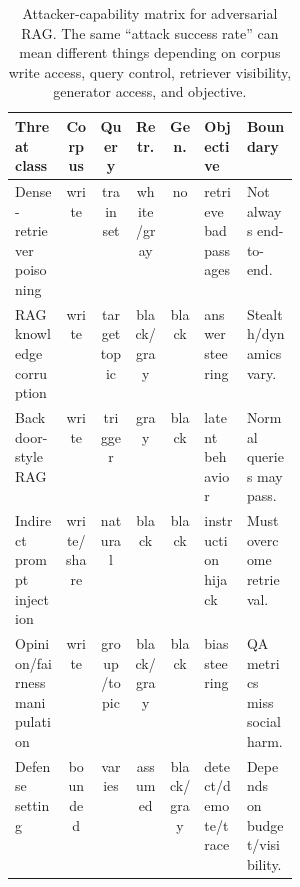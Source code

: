 \begin{table}[t]
\centering
\scriptsize
\renewcommand{\arraystretch}{0.88}
\begin{tabularx}{\linewidth}{>{\raggedright\arraybackslash}p{0.18\linewidth}c c c c >{\raggedright\arraybackslash}p{0.15\linewidth}X}
\toprule
\textbf{Threat class} & \textbf{Corpus} & \textbf{Query} & \textbf{Retr.} & \textbf{Gen.} & \textbf{Objective} & \textbf{Boundary} \\
\midrule
Dense-retriever poisoning \citep{poisoningRetrievalCorpora2023} & write & train set & white/gray & no & retrieve bad passages & Not always end-to-end. \\
RAG knowledge corruption \citep{poisonedRAG2024,badRAG2024} & write & target topic & black/gray & black & answer steering & Stealth/dynamics vary. \\
Backdoor-style RAG \citep{trojanRAG2024,phantom2024} & write & trigger & gray & black & latent behavior & Normal queries may pass. \\
Indirect prompt injection \citep{aip2025,rrag005} & write/share & natural & black & black & instruction hijack & Must overcome retrieval. \\
Opinion/fairness manipulation \citep{rrag104,rrag162} & write & group/topic & black/gray & black & bias steering & QA metrics miss social harm. \\
Defense setting \citep{certifiedRAG2024,rrag004,rrag015,rrag128} & bounded & varies & assumed & black/gray & detect/demote/trace & Depends on budget/visibility. \\
\bottomrule
\end{tabularx}
\caption{Attacker-capability matrix for adversarial RAG. The same ``attack success rate'' can mean different things depending on corpus write access, query control, retriever visibility, generator access, and objective.}
\label{tab:attacker-capability}
\end{table}
